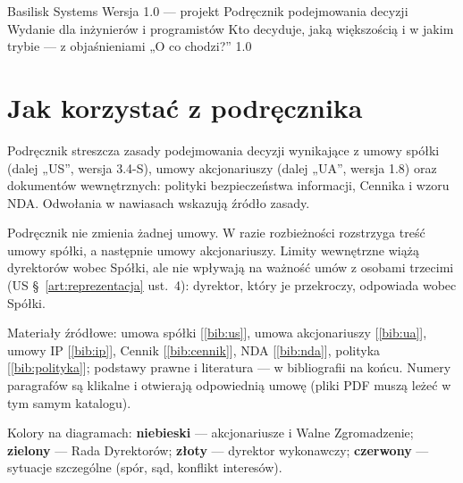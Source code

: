 \documentclass[11pt,a4paper]{report}
\newcommand{\Zr}[1]{[\ref{bib:#1}]}
\begin{document}
\BusinessPlanTitlePage
  {Basilisk Systems}
  {Wersja 1.0 --- projekt}
  {Podręcznik podejmowania decyzji}
  {Wydanie dla inżynierów i programistów}
  {Kto decyduje, jaką większością i w jakim trybie --- z objaśnieniami „O co chodzi?”}
  {1.0}

\tableofcontents
\newpage

\section{Jak korzystać z podręcznika}

Podręcznik streszcza zasady podejmowania decyzji wynikające z umowy spółki (dalej „US”, wersja 3.4-S), umowy akcjonariuszy (dalej „UA”, wersja 1.8) oraz dokumentów wewnętrznych: polityki bezpieczeństwa informacji, Cennika i wzoru NDA. Odwołania w nawiasach wskazują źródło zasady.

\begin{Uwaga}
Podręcznik nie zmienia żadnej umowy. W razie rozbieżności rozstrzyga treść umowy spółki, a następnie umowy akcjonariuszy. Limity wewnętrzne wiążą dyrektorów wobec Spółki, ale nie wpływają na ważność umów z osobami trzecimi (US §~\ref{art:reprezentacja} ust.~4): dyrektor, który je przekroczy, odpowiada wobec Spółki.
\end{Uwaga}

Materiały źródłowe: umowa spółki \Zr{us}, umowa akcjonariuszy \Zr{ua}, umowy IP \Zr{ip}, Cennik \Zr{cennik}, NDA \Zr{nda}, polityka \Zr{polityka}; podstawy prawne i literatura --- w bibliografii na końcu. Numery paragrafów są klikalne i otwierają odpowiednią umowę (pliki PDF muszą leżeć w tym samym katalogu).

Kolory na diagramach: \textcolor{cWZ}{\textbf{niebieski}} --- akcjonariusze i Walne Zgromadzenie; \textcolor{cRD}{\textbf{zielony}} --- Rada Dyrektorów; \textcolor{cDW}{\textbf{złoty}} --- dyrektor wykonawczy; \textcolor{cX}{\textbf{czerwony}} --- sytuacje szczególne (spór, sąd, konflikt interesów).
\end{document}
